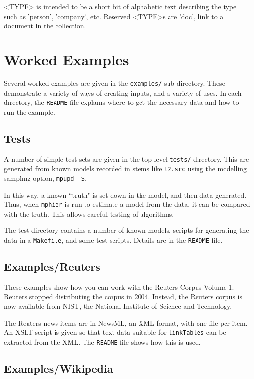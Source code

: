 \documentclass{article}
\begin{document}
<TYPE> is intended to be a short bit of alphabetic text describing the
type such as 'person', 'company', etc.
Reserved <TYPE>s are 'doc', link to a document in the collection,


\section{Worked Examples}

Several worked examples are given in the {\tt examples/} sub-directory.
These demonstrate a variety of ways of creating inputs, and a variety of uses.
In each directory, the {\tt README} file explains where to get the
necessary data and how to run the example.

\subsection{Tests}

A number of simple test sets are given in the top level
{\tt tests/} directory.   This are generated from known
models recorded in stems like {\tt t2.src} using the modelling
sampling option, {\tt mpupd -S}.

In this way, a known ``truth" is set down in the model, and then
data generated.  Thus, when {\tt mphier} is run to estimate a model
from the data, it can be compared with the truth.
This allows careful testing of algorithms.

The test directory contains a number of known models, scripts for
generating the data in a {\tt Makefile}, and some test scripts.
Details are in the {\tt README} file.

\subsection{Examples/Reuters}

These examples show how you can work with the Reuters Corpus Volume 1.
Reuters stopped distributing the corpus in 2004. 
Instead, the Reuters corpus is now available from NIST, the 
National Institute of Science and Technology.

The Reuters news items are in NewsML, an XML format, with one
file per item.   An XSLT script is given so that text data suitable
for {\tt linkTables} can be extracted from the XML.
The {\tt README} file shows how this is used.

\subsection{Examples/Wikipedia}
\end{document}
